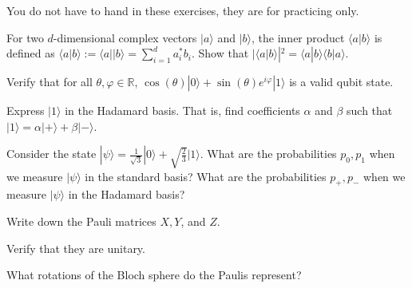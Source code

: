 \documentclass[a4paper,10pt,landscape,twocolumn]{scrartcl}
\newcommand{\ket}[1]{| #1 \rangle}
\begin{document}
\practiceproblems

{\sffamily\noindent
You do not have to hand in these exercises, they are for practicing only. %
}

\begin{exercise}
For two $d$-dimensional complex vectors $\ket{a}$ and $\ket{b}$, the
inner product $\langle a | b \rangle$ is defined as $\langle a | b
\rangle := \langle a || b \rangle = \sum_{i=1}^d a^*_ib_i$. Show that $|\langle a | b\rangle|^2 = \langle a | b \rangle\langle b | a \rangle$.
\end{exercise}

\begin{exercise}
Verify that for all $\theta, \varphi \in \mathbb{R}$, $\cos(\theta) \ket{0} + \sin(\theta)e^{i\varphi}\ket{1}$ is a valid qubit state.
\end{exercise}

\begin{exercise}
Express $\ket1$ in the Hadamard basis. That is, find coefficients $\alpha$ and $\beta$ such that $\ket1 = \alpha \ket+ + \beta \ket-$.
\end{exercise}

\begin{exercise}[Measurement]
Consider the state $\ket\psi = \frac{1}{\sqrt{3}}\ket0 + \sqrt{\frac{2}{3}}\ket1$. What are the probabilities $p_0, p_1$ when we measure $\ket\psi$ in the standard basis? What are the probabilities $p_+, p_-$ when we measure $\ket\psi$ in the Hadamard basis?
\end{exercise}

\begin{exercise}
\begin{subex}
Write down the Pauli matrices $X, Y$, and $Z$.
\end{subex}
\begin{subex}
Verify that they are unitary.
\end{subex}
\begin{subex}
What rotations of the Bloch sphere do the Paulis represent?
\end{subex}
\end{exercise}
\end{document}
